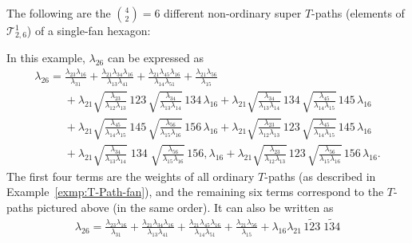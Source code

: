 \documentclass[pdftex]{sigma}
\numberwithin{equation}{section}
\begin{document}
\begin{Example}\label{exmp:super-T-path-fan}\rm \allowdisplaybreaks
 The following are the ${4 \choose 2}=6$ different non-ordinary super $T$-paths (elements of $\mathcal{T}^1_{2,6}$) of a single-fan hexagon:
\begin{center}

\end{center}
In this example, $\lambda_{26}$ can be expressed as
 \begin{gather*}
 \lambda_{26} = \frac{\lambda_{23}\lambda_{16}}{\lambda_{31}}
 + \frac{\lambda_{21}\lambda_{34}\lambda_{16}}{\lambda_{13}\lambda_{41}}
 + \frac{\lambda_{21}\lambda_{45}\lambda_{16}}{\lambda_{14}\lambda_{51}}
 + \frac{\lambda_{21}\lambda_{56}}{\lambda_{15}} \\
 \phantom{\lambda_{26}=} + \lambda_{21} \sqrt{\frac{\lambda_{23}}{\lambda_{12}\lambda_{13}}} \, \boxed{123} \, \sqrt{\frac{\lambda_{34}}{\lambda_{13}\lambda_{14}}} \, \boxed{134} \, \lambda_{16}
+ \lambda_{21} \sqrt{\frac{\lambda_{34}}{\lambda_{13}\lambda_{14}}} \, \boxed{134} \, \sqrt{\frac{\lambda_{45}}{\lambda_{14}\lambda_{15}}} \, \boxed{145} \, \lambda_{16} \\
 \phantom{\lambda_{26}=} + \lambda_{21} \sqrt{\frac{\lambda_{45}}{\lambda_{14}\lambda_{15}}} \, \boxed{145} \, \sqrt{\frac{\lambda_{56}}{\lambda_{15}\lambda_{16}}} \, \boxed{156} \, \lambda_{16}
+ \lambda_{21} \sqrt{\frac{\lambda_{23}}{\lambda_{12}\lambda_{13}}} \, \boxed{123} \, \sqrt{\frac{\lambda_{45}}{\lambda_{14}\lambda_{15}}} \, \boxed{145} \, \lambda_{16} \\
 \phantom{\lambda_{26}=} + \lambda_{21} \sqrt{\frac{\lambda_{34}}{\lambda_{13}\lambda_{14}}} \; \boxed{134} \; \sqrt{\frac{\lambda_{56}}{\lambda_{15}\lambda_{16}}} \, \boxed{156} , \lambda_{16}
+ \lambda_{21} \sqrt{\frac{\lambda_{23}}{\lambda_{12}\lambda_{13}}} \, \boxed{123} \, \sqrt{\frac{\lambda_{56}}{\lambda_{15}\lambda_{16}}} \, \boxed{156} \, \lambda_{16}.
 \end{gather*}
 The first four terms are the weights of all ordinary $T$-paths (as described in Example~\ref{exmp:T-Path-fan}),
 and the remaining six terms correspond to the $T$-paths pictured above (in the same order).
 It can also be written as
 \begin{gather*}
 \lambda_{26} = \frac{\lambda_{23}\lambda_{16}}{\lambda_{31}}
 + \frac{\lambda_{21}\lambda_{34}\lambda_{16}}{\lambda_{13}\lambda_{41}}
 + \frac{\lambda_{21}\lambda_{45}\lambda_{16}}{\lambda_{14}\lambda_{51}}
 + \frac{\lambda_{21}\lambda_{56}}{\lambda_{15}}
 + \lambda_{16}\lambda_{21} \, \widetilde{\boxed{123}} \; \widetilde{\boxed{134}}

\end{gather*}
\end{Example}
\end{document}
